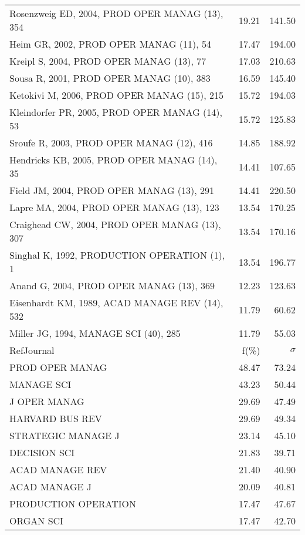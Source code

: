 \documentclass[a4paper,11pt]{report}
\begin{document}
\begin{landscape}
\begin{table}[!ht]
{\begin{tabular}{|l r r|}
Rosenzweig ED, 2004, PROD OPER MANAG (13), 354 & 19.21 & 141.50\\
Heim GR, 2002, PROD OPER MANAG (11), 54 & 17.47 & 194.00\\
Kreipl S, 2004, PROD OPER MANAG (13), 77 & 17.03 & 210.63\\
Sousa R, 2001, PROD OPER MANAG (10), 383 & 16.59 & 145.40\\
Ketokivi M, 2006, PROD OPER MANAG (15), 215 & 15.72 & 194.03\\
Kleindorfer PR, 2005, PROD OPER MANAG (14), 53 & 15.72 & 125.83\\
Sroufe R, 2003, PROD OPER MANAG (12), 416 & 14.85 & 188.92\\
Hendricks KB, 2005, PROD OPER MANAG (14), 35 & 14.41 & 107.65\\
Field JM, 2004, PROD OPER MANAG (13), 291 & 14.41 & 220.50\\
Lapre MA, 2004, PROD OPER MANAG (13), 123 & 13.54 & 170.25\\
Craighead CW, 2004, PROD OPER MANAG (13), 307 & 13.54 & 170.16\\
Singhal K, 1992, PRODUCTION OPERATION (1), 1 & 13.54 & 196.77\\
Anand G, 2004, PROD OPER MANAG (13), 369 & 12.23 & 123.63\\
Eisenhardt KM, 1989, ACAD MANAGE REV (14), 532 & 11.79 & 60.62\\
Miller JG, 1994, MANAGE SCI (40), 285 & 11.79 & 55.03\\
\hline
\hline
RefJournal & f(\%) & $\sigma$\\
\hline
PROD OPER MANAG & 48.47 & 73.24\\
MANAGE SCI & 43.23 & 50.44\\
J OPER MANAG & 29.69 & 47.49\\
HARVARD BUS REV & 29.69 & 49.34\\
STRATEGIC MANAGE J & 23.14 & 45.10\\
DECISION SCI & 21.83 & 39.71\\
ACAD MANAGE REV & 21.40 & 40.90\\
ACAD MANAGE J & 20.09 & 40.81\\
PRODUCTION OPERATION & 17.47 & 47.67\\
ORGAN SCI & 17.47 & 42.70\\
\hline
\end{tabular}
}
\end{table}

\clearpage


\end{landscape}
\end{document}
